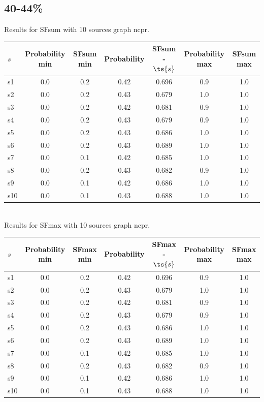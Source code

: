 \documentclass{article}
\begin{document}
\newpage

\subsection{40-44\%}

\noindent Results for SFsum with 10 sources graph ncpr.

\noindent\begin{tabular}{|l|c|c|c|c|c|c|}
\hline
$s$& Probability min & SFsum min & Probability & SFsum - $\ts{s}$ & Probability max & SFsum max\\
\hline
s1 &0.0 & 0.2 & 0.42 & 0.696 & 0.9 & 1.0\\
\hline
s2 &0.0 & 0.2 & 0.43 & 0.679 & 1.0 & 1.0\\
\hline
s3 &0.0 & 0.2 & 0.42 & 0.681 & 0.9 & 1.0\\
\hline
s4 &0.0 & 0.2 & 0.43 & 0.679 & 0.9 & 1.0\\
\hline
s5 &0.0 & 0.2 & 0.43 & 0.686 & 1.0 & 1.0\\
\hline
s6 &0.0 & 0.2 & 0.43 & 0.689 & 1.0 & 1.0\\
\hline
s7 &0.0 & 0.1 & 0.42 & 0.685 & 1.0 & 1.0\\
\hline
s8 &0.0 & 0.2 & 0.43 & 0.682 & 0.9 & 1.0\\
\hline
s9 &0.0 & 0.1 & 0.42 & 0.686 & 1.0 & 1.0\\
\hline
s10 &0.0 & 0.1 & 0.43 & 0.688 & 1.0 & 1.0\\
\hline
\end{tabular}\\

\noindent Results for SFmax with 10 sources graph ncpr.

\noindent\begin{tabular}{|l|c|c|c|c|c|c|}
\hline
$s$& Probability min & SFmax min & Probability & SFmax - $\ts{s}$ & Probability max & SFmax max\\
\hline
s1 &0.0 & 0.2 & 0.42 & 0.696 & 0.9 & 1.0\\
\hline
s2 &0.0 & 0.2 & 0.43 & 0.679 & 1.0 & 1.0\\
\hline
s3 &0.0 & 0.2 & 0.42 & 0.681 & 0.9 & 1.0\\
\hline
s4 &0.0 & 0.2 & 0.43 & 0.679 & 0.9 & 1.0\\
\hline
s5 &0.0 & 0.2 & 0.43 & 0.686 & 1.0 & 1.0\\
\hline
s6 &0.0 & 0.2 & 0.43 & 0.689 & 1.0 & 1.0\\
\hline
s7 &0.0 & 0.1 & 0.42 & 0.685 & 1.0 & 1.0\\
\hline
s8 &0.0 & 0.2 & 0.43 & 0.682 & 0.9 & 1.0\\
\hline
s9 &0.0 & 0.1 & 0.42 & 0.686 & 1.0 & 1.0\\
\hline
s10 &0.0 & 0.1 & 0.43 & 0.688 & 1.0 & 1.0\\
\hline
\end{tabular}\\
\end{document}

